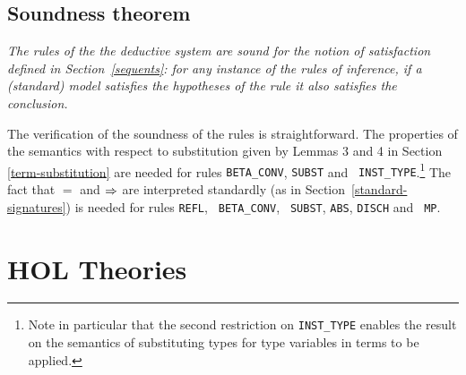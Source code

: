 \subsection{Soundness theorem}
\label{soundness}

\emph{The rules of the the \HOL{} deductive system are {\em sound} for
the notion of satisfaction defined
in Section~\ref{sequents}:
for any instance of the rules of inference,
if a (standard) model satisfies the hypotheses of the rule it also
satisfies the conclusion.}

\medskip

The verification of the soundness of the rules is straightforward.
The properties of the semantics with respect to substitution given by
Lemmas 3 and 4 in Section \ref{term-substitution} are needed for rules
{\small\tt BETA\_CONV}, {\small\tt SUBST} and {\small\tt
INST\_TYPE}.\footnote{Note in
particular that the second restriction on {\tt INST\_TYPE} enables the
result on the semantics of substituting types for type variables in
terms to be applied.} The fact that $=$ and $\Rightarrow$ are interpreted
standardly (as in Section~\ref{standard-signatures}) is needed for
rules {\small\tt REFL}, {\small\tt
BETA\_CONV}, {\small\tt
SUBST}, {\small\tt ABS},
{\small\tt DISCH} and {\small\tt
MP}.

\section{HOL Theories}
\label{theories}

